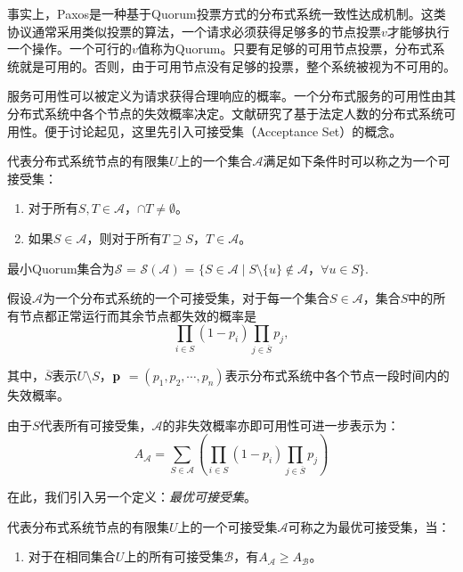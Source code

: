 事实上，Paxos是一种基于Quorum投票方式\cite{Gifford:1979:WVR:800215.806583}的分布式系统一致性达成机制。这类协议通常采用类似投票的算法，一个请求必须获得足够多的节点投票$v$才能够执行一个操作。一个可行的$v$值称为Quorum。只要有足够的可用节点投票，分布式系统就是可用的。否则，由于可用节点没有足够的投票，整个系统被视为不可用的。

服务可用性可以被定义为请求获得合理响应的概率。一个分布式服务的可用性由其分布式系统中各个节点的失效概率决定。文献\cite{Peleg1995210}研究了基于法定人数的分布式系统可用性。便于讨论起见，这里先引入可接受集（Acceptance Set）的概念\cite{Amir1998223}。

\begin{definition}
代表分布式系统节点的有限集$U$上的一个集合$\mathcal{A}$满足如下条件时可以称之为一个可接受集：
\begin{enumerate}[1)]
\item 对于所有$S, T \in \mathcal{A}$，$\cap T \neq \emptyset$。
\item 如果$S \in \mathcal{A}$，则对于所有$T \supseteq S$，$T \in \mathcal{A}$。
\end{enumerate}
最小Quorum集合为$\mathcal{S}$ = $\mathcal{S}(\mathcal{A})$ = $\{S \in \mathcal{A} \mid S \setminus \{u\} \notin \mathcal{A}$，$\forall u \in S\}$.
\end{definition}

假设$\mathcal{A}$为一个分布式系统的一个可接受集，对于每一个集合$S \in \mathcal{A}$，集合$S$中的所有节点都正常运行而其余节点都失效的概率是
\begin{equation}\nonumber
\prod_{i \in S} (1-p_i) \prod_{j \in \overline S} p_j,
\end{equation}

其中，$\overline S$表示$U \setminus S$，$\bf p$ $= (p_1, p_2, \cdots, p_n)$表示分布式系统中各个节点一段时间内的失效概率。

由于$S$代表所有可接受集，$\mathcal{A}$的非失效概率亦即可用性可进一步表示为：
\begin{equation}\label{eq_a_as}
A_{\mathcal{A}} = \sum_{S \in \mathcal{A}}(\prod_{i \in S} (1-p_i) \prod_{j \in \overline S} p_j)
\end{equation}

在此，我们引入另一个定义：\emph{最优可接受集}。
\begin{definition}
代表分布式系统节点的有限集$U$上的一个可接受集$\mathcal{A}$可称之为最优可接受集，当：
\begin{enumerate}[1)]
\item 对于在相同集合$U$上的所有可接受集$\mathcal{B}$，有$A_{\mathcal{A}} \geq A_{\mathcal{B}}$。
\end{enumerate}
\end{definition}

